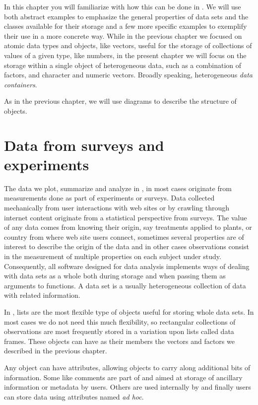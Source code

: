\documentclass[krantz2]{krantz}\usepackage{knitr}
\begin{document}
In this chapter you will familiarize with how this can be done in \Rlang. We will use both abstract examples to emphasize the general properties of data sets and the \Rlang classes available for their storage and a few more specific examples to exemplify their use in a more concrete way. While in the previous chapter we focused on atomic data types and objects, like vectors, useful for the storage of collections of values of a given type, like numbers, in the present chapter we will focus on the storage within a single object of heterogeneous data, such as a combination of factors, and character and numeric vectors. Broadly speaking, heterogeneous \emph{data containers}.

As in the previous chapter, we will use diagrams to describe the structure of objects.


\section{Data from surveys and experiments}
The data we plot, summarize and analyze in \Rlang, in most cases originate from measurements done as part of experiments or surveys. Data collected mechanically from user interactions with web sites or by crawling through internet content originate from a statistical perspective from surveys. The value of any data comes from knowing their origin, say treatments applied to plants, or country from where web site users connect, sometimes several properties are of interest to describe the origin of the data and in other cases observations consist in the measurement of multiple properties on each subject under study. Consequently, all software designed for data analysis implements ways of dealing with data sets as a whole both during storage and when passing them as arguments to functions. A data set is a usually heterogeneous collection of data with related information.

In \Rlang, lists are the most flexible type of objects useful for storing whole data sets. In most cases we do not need this much flexibility, so rectangular collections of observations are most frequently stored in a variation upon lists called data frames. These objects can have as their members the vectors and factors we described in the previous chapter.

Any \Rlang object can have attributes, allowing objects to carry along additional bits of information. Some like comments are part of \Rlang and aimed at storage of ancillary information or metadata by users. Others are used internally by \Rlang and finally users can store data using attributes named \emph{ad hoc}.
\end{document}
